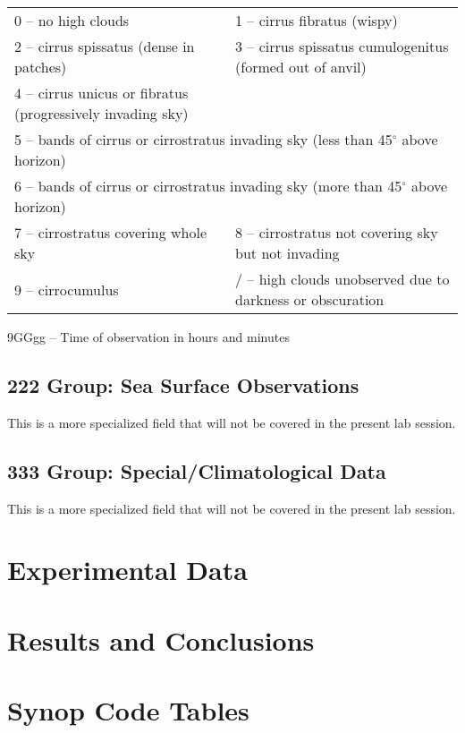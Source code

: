 \documentclass{article}
\begin{document}
\begin{description}
\begin{description}
        \begin{tabular}{ll}
          0 -- no high clouds&1 -- cirrus fibratus (wispy)\\
          2 -- cirrus spissatus (dense in patches)&3 -- cirrus spissatus cumulogenitus (formed out of anvil)\\
          4 -- cirrus unicus or fibratus (progressively invading sky) &\\
          \multicolumn{2}{l}{5 -- bands of cirrus or cirrostratus invading sky (less than 45$^\circ$ above horizon)}\\
          \multicolumn{2}{l}{6 -- bands of cirrus or cirrostratus invading sky (more than 45$^\circ$ above horizon)}\\
          7 -- cirrostratus covering whole sky&8 -- cirrostratus not covering sky but not invading\\
          9 -- cirrocumulus &/ -- high clouds unobserved due to darkness or obscuration \\
      \end{tabular}
\end{description}
\end{description}

9GGgg -- Time of observation in hours and minutes

\subsection{222 Group:  Sea Surface Observations}

This is a more specialized field that will not be covered in the present lab session.

\subsection{333 Group:  Special/Climatological Data}

This is a more specialized field that will not be covered in the present lab session.


\section{Experimental Data}



\newpage
\section{Results and Conclusions}


\nocite{WinNT}
\newpage
\appendix
\section{Synop Code Tables}



%



\end{document}
